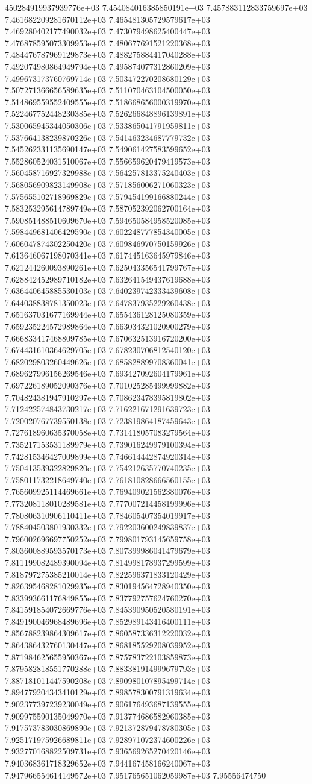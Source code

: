 450284919937939776e+03	7.454084016385850191e+03	7.457883112833759697e+03	7.461682209281670112e+03	7.465481305729579617e+03	7.469280402177490032e+03	7.473079498625400447e+03	7.476878595073309953e+03	7.480677691521220368e+03	7.484476787969129873e+03	7.488275884417040288e+03	7.492074980864949794e+03	7.495874077312860209e+03	7.499673173760769714e+03	7.503472270208680129e+03	7.507271366656589635e+03	7.511070463104500050e+03	7.514869559552409555e+03	7.518668656000319970e+03	7.522467752448230385e+03	7.526266848896139891e+03	7.530065945344050306e+03	7.533865041791959811e+03	7.537664138239870226e+03	7.541463234687779732e+03	7.545262331135690147e+03	7.549061427583599652e+03	7.552860524031510067e+03	7.556659620479419573e+03	7.560458716927329988e+03	7.564257813375240403e+03	7.568056909823149908e+03	7.571856006271060323e+03	7.575655102718969829e+03	7.579454199166880244e+03	7.583253295614789749e+03	7.587052392062700164e+03	7.590851488510609670e+03	7.594650584958520085e+03	7.598449681406429590e+03	7.602248777854340005e+03	7.606047874302250420e+03	7.609846970750159926e+03	7.613646067198070341e+03	7.617445163645979846e+03	7.621244260093890261e+03	7.625043356541799767e+03	7.628842452989710182e+03	7.632641549437619688e+03	7.636440645885530103e+03	7.640239742333439608e+03	7.644038838781350023e+03	7.647837935229260438e+03	7.651637031677169944e+03	7.655436128125080359e+03	7.659235224572989864e+03	7.663034321020900279e+03	7.666833417468809785e+03	7.670632513916720200e+03	7.674431610364629705e+03	7.678230706812540120e+03	7.682029803260449626e+03	7.685828899708360041e+03	7.689627996156269546e+03	7.693427092604179961e+03	7.697226189052090376e+03	7.701025285499999882e+03	7.704824381947910297e+03	7.708623478395819802e+03	7.712422574843730217e+03	7.716221671291639723e+03	7.720020767739550138e+03	7.723819864187459643e+03	7.727618960635370058e+03	7.731418057083279564e+03	7.735217153531189979e+03	7.739016249979100394e+03	7.742815346427009899e+03	7.746614442874920314e+03	7.750413539322829820e+03	7.754212635770740235e+03	7.758011732218649740e+03	7.761810828666560155e+03	7.765609925114469661e+03	7.769409021562380076e+03	7.773208118010289581e+03	7.777007214458199996e+03	7.780806310906110411e+03	7.784605407354019917e+03	7.788404503801930332e+03	7.792203600249839837e+03	7.796002696697750252e+03	7.799801793145659758e+03	7.803600889593570173e+03	7.807399986041479679e+03	7.811199082489390094e+03	7.814998178937299599e+03	7.818797275385210014e+03	7.822596371833120429e+03	7.826395468281029935e+03	7.830194564728940350e+03	7.833993661176849855e+03	7.837792757624760270e+03	7.841591854072669776e+03	7.845390950520580191e+03	7.849190046968489696e+03	7.852989143416400111e+03	7.856788239864309617e+03	7.860587336312220032e+03	7.864386432760130447e+03	7.868185529208039952e+03	7.871984625655950367e+03	7.875783722103859873e+03	7.879582818551770288e+03	7.883381914999679793e+03	7.887181011447590208e+03	7.890980107895499714e+03	7.894779204343410129e+03	7.898578300791319634e+03	7.902377397239230049e+03	7.906176493687139555e+03	7.909975590135049970e+03	7.913774686582960385e+03	7.917573783030869890e+03	7.921372879478780305e+03	7.925171975926689811e+03	7.928971072374600226e+03	7.932770168822509731e+03	7.936569265270420146e+03	7.940368361718329652e+03	7.944167458166240067e+03	7.947966554614149572e+03	7.951765651062059987e+03	7.95556474750